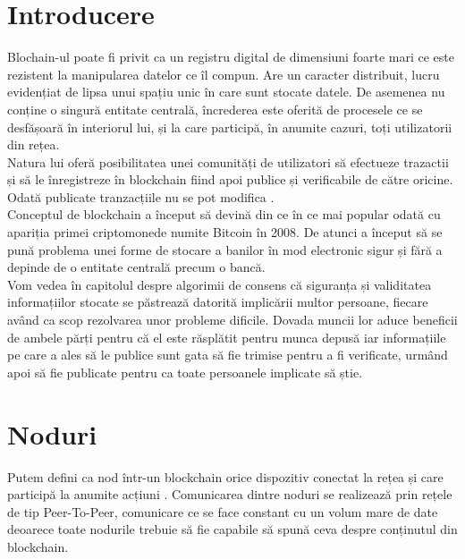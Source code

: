 
\section{Introducere}
\hfill

Blochain-ul poate fi privit ca un registru digital de dimensiuni foarte mari ce este rezistent la manipularea datelor ce îl compun. Are un caracter distribuit, lucru evidențiat de lipsa unui spațiu unic în care sunt stocate datele. De asemenea nu conține o singură entitate centrală, încrederea este oferită de procesele ce se desfășoară în interiorul lui, și la care participă, în anumite cazuri, toți utilizatorii din rețea.\\

Natura lui oferă posibilitatea unei comunități de utilizatori să efectueze trazactii și să le înregistreze în blockchain fiind apoi publice și verificabile de către oricine. Odată publicate tranzacțiile nu se pot modifica \cite{Blockchain_Overview_NIST}.\\

Conceptul de blockchain a început să devină din ce în ce mai popular odată cu apariția primei criptomonede numite Bitcoin în 2008. De atunci a început să se pună problema unei forme de stocare a banilor în mod electronic sigur și fără a depinde de o entitate centrală precum o bancă.\\

Vom vedea în capitolul despre algorimii de consens că siguranța și validitatea informațiilor stocate se păstrează datorită implicării multor persoane, fiecare având ca scop rezolvarea unor probleme dificile. Dovada muncii lor aduce beneficii de ambele părți pentru că el este răsplătit pentru munca depusă iar informațiile pe care a ales să le publice sunt gata să fie trimise pentru a fi verificate, urmând apoi să fie publicate pentru ca toate persoanele implicate să știe.\\

\hfill

\section{Noduri}
\hfill

Putem defini ca nod într-un blockchain orice dispozitiv conectat la rețea și care participă la anumite acțiuni \cite{Blockchain_Node_Types}. Comunicarea dintre noduri se realizează prin rețele de tip Peer-To-Peer, comunicare ce se face constant cu un volum mare de date deoarece toate nodurile trebuie să fie capabile să spună ceva despre conținutul din blockchain.\\

